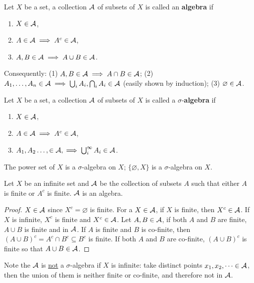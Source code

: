 \documentclass[11pt]{article}
\begin{document}
	\begin{definition}
		Let $X$ be a set, a collection $\mathcal{{A}}$ of subsets of $X$ is called an \textbf{algebra} if
		\begin{enumerate}
			\item $X \in \mathcal{{A}}$,
			\item $A \in \mathcal{{A}} \implies A^c \in \mathcal{{A}}$,
			\item $A, B \in \mathcal{{A}} \implies A \cup B \in \mathcal{{A}}$.
		\end{enumerate}
		Consequently: (1) $A, B \in \mathcal{{A}} \implies A \cap B \in \mathcal{{A}}$; (2) $A_1, \dots, A_n \in \mathcal{{A}} \implies \bigcup_i A_i, \bigcap_i A_i \in \mathcal{{A}}$ (easily shown by induction); (3) $\varnothing \in \mathcal{{A}}$.
	\end{definition}
	
	\begin{definition}
		Let $X$ be a set, a collection $\mathcal{{A}}$ of subsets of $X$ is called a $\sigma$-\textbf{algebra} if
		\begin{enumerate}
			\item $X \in \mathcal{{A}}$,
			\item $A \in \mathcal{{A}} \implies A^c \in \mathcal{{A}}$,
			\item $A_1, A_2 \dots, \in \mathcal{{A}}, \implies \bigcup_i^\infty A_i \in \mathcal{{A}}$.
		\end{enumerate}
	\end{definition}
	
	\begin{example}
		The power set of $X$ is a $\sigma$-algebra on $X$; $\{\varnothing, X\}$ is a $\sigma$-algebra on $X$.
	\end{example}
	
	\begin{example}
		Let $X$ be an infinite set and $\mathcal{{A}}$ be the collection of subsets $A$ such that either $A$ is finite or $A^c$ is finite. $\mathcal{{A}}$ is an algebra.
		\begin{proof}
			$X \in \mathcal{{A}}$ since $X^c = \varnothing$ is finite. For a $X \in \mathcal{{A}}$, if $X$ is finite, then $X^c \in \mathcal{{A}}$. If $X$ is infinite, $X^c$ is finite and $X^c \in \mathcal{{A}}$. Let $A, B \in \mathcal{{A}}$, if both $A$ and $B$ are finite, $A \cup B$ is finite and in $\mathcal{{A}}$. If $A$ is finite and $B$ is co-finite, then $(A \cup B)^c = A^c \cap B^c \subseteq B^c$ is finite. If both $A$ and $B$ are co-finite, $(A \cup B)^c$ is finite so that $A \cup B \in \mathcal{{A}}$.
		\end{proof}
		Note the $\mathcal{{A}}$ is \ul{not} a $\sigma$-algebra if $X$ is infinite: take distinct points $x_1, x_2, \dots \in \mathcal{{A}}$, then the union of them is neither finite or co-finite, and therefore not in $\mathcal{{A}}$.
	\end{example}
	
\end{document}
